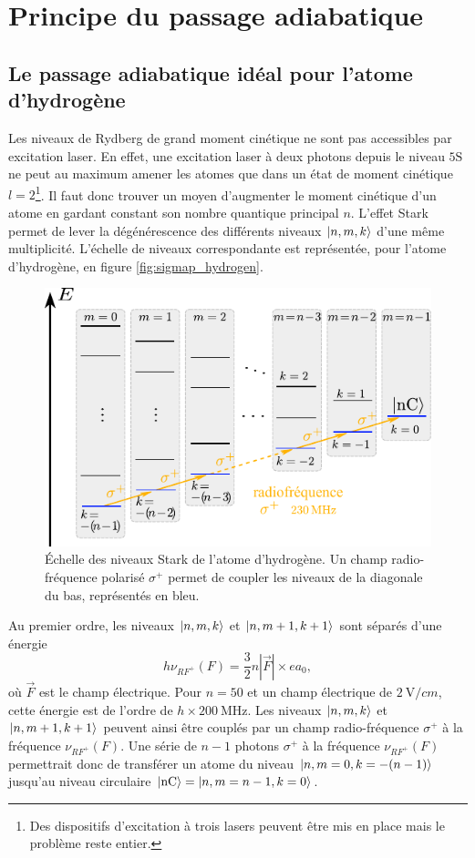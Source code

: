 \section{Principe du passage adiabatique}
 \subsection{Le passage adiabatique idéal pour l'atome d'hydrogène}
\noindent Les niveaux de Rydberg de grand moment cinétique ne sont pas accessibles par excitation laser.
En effet, une excitation laser à deux photons depuis le niveau $\mathrm{5S}$ ne peut au maximum amener les atomes que dans un état de moment cinétique $l=2$\footnote{
Des dispositifs d'excitation à trois lasers peuvent être mis en place mais le problème reste entier.
}.
Il faut donc trouver un moyen d'augmenter le moment cinétique d'un atome en gardant constant son nombre quantique principal $n$.
L'effet Stark permet de lever la dégénérescence des différents niveaux $\ket{n,m,k}$ d'une même multiplicité.
L'échelle de niveaux correspondante est représentée, pour l'atome d'hydrogène, en figure \eqref{fig:sigmap_hydrogen}.
%
\begin{figure}[t]
\centering
\includegraphics[width=.6\linewidth]{figures/circulars/sigmap_hydrogen}
\caption[Échelle des niveaux Stark de l'atome d'hydrogène]{
Échelle des niveaux Stark de l'atome d'hydrogène.
Un champ radio-fréquence polarisé $\sigma^+$ permet de coupler les niveaux de la diagonale du bas, représentés en bleu.
}
\label{fig:sigmap_hydrogen}
\end{figure} 
%
Au premier ordre, les niveaux $\ket{n,m,k}$ et $\ket{n,m+1,k+1}$ sont séparés d'une énergie
\begin{equation}
h\nu_{RF^+}(F) = \frac{3}{2}n|\vec{F}|\times ea_0 , %
\end{equation}
où $\vec{F}$ est le champ électrique. %
Pour $n=50$ et un champ électrique de $\SI{2}{\V/cm}$, cette énergie est de l'ordre de $h\times\SI{200}{\MHz}$.
Les niveaux $\ket{n,m,k}$ et $\ket{n,m+1,k+1}$ peuvent ainsi être couplés par un champ radio-fréquence $\sigma^+$ à la fréquence $\nu_{RF^+}(F)$.
Une série de $n-1$ photons $\sigma^+$ à la fréquence $\nu_{RF^+}(F)$ permettrait donc de transférer un atome du niveau $\ket{n,m=0,k=-(n-1)}$ jusqu'au niveau circulaire $\ket{\mathrm{nC}}=\ket{n,m=n-1,k=0}$.

